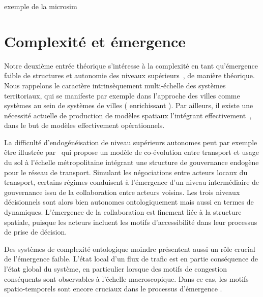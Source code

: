 \documentclass[11pt]{article}
\begin{document}

exemple de la microsim \cite{birkin2011spatial}



\section{Complexité et émergence}



Notre deuxième entrée théorique s'intéresse à la complexité en tant qu'émergence faible de structures et autonomie des niveaux supérieurs~\citep{bedau2002downward}, de manière théorique. Nous rappelons le caractère intrinsèquement multi-échelle des systèmes territoriaux, qui se manifeste par exemple dans l'approche des villes comme systèmes au sein de systèmes de villes (\cite{pumain1997pour} enrichissant \cite{berry1964cities}). Par ailleurs, il existe une nécessité actuelle de production de modèles spatiaux l'intégrant effectivement~\citep{rozenblat2018conclusion}, dans le but de modèles effectivement opérationnels.

La difficulté d'endogénéisation de niveau supérieurs autonomes peut par exemple être illustrée par~\cite{lenechet:halshs-01272236} qui propose un modèle de co-évolution entre transport et usage du sol à l'échelle métropolitaine intégrant une structure de gouvernance endogène pour le réseau de transport. Simulant les négociations entre acteurs locaux du transport, certains régimes conduisent à l'émergence d'un niveau intermédiaire de gouvernance issu de la collaboration entre acteurs voisins. Les trois niveaux décisionnels sont alors bien autonomes ontologiquement mais aussi en termes de dynamiques. L'émergence de la collaboration est finement liée à la structure spatiale, puisque les acteurs incluent les motifs d'accessibilité dans leur processus de prise de décision.

Des systèmes de complexité ontologique moindre présentent aussi un rôle crucial de l'émergence faible. L'état local d'un flux de trafic est en partie conséquence de l'état global du système, en particulier lorsque des motifs de congestion conséquents sont observables à l'échelle macroscopique. Dans ce cas, les motifs spatio-temporels sont encore cruciaux dans le processus d'émergence \citep{treiber2010three}.
\end{document}
